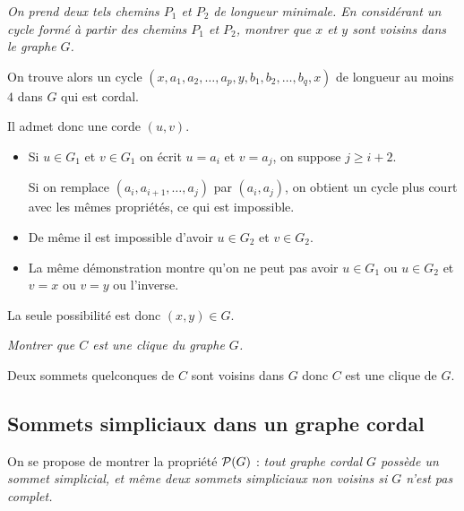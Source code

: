 \begin{Exercise}\it
On prend deux tels chemins $P_1$ et $P_2$ de longueur minimale. En considérant un cycle formé à partir des chemins $P_1$ et $P_2$, montrer que $x$ et $y$ sont voisins dans le graphe $G$.
\end{Exercise}  
\begin{Answer}
On trouve alors un cycle $(x, a_1,a_2, \ldots,a_p,y, b_1,b_2, \ldots,b_q,x)$ de longueur au moins $4$ dans $G$ qui est cordal.

Il admet donc une corde $(u,v)$. 
\begin{itemize}
\item Si $u\in G_1$ et $v\in G_1$ on écrit $u=a_i$ et $v=a_j$, on suppose $j\ge i+2$.

Si on remplace $(a_i,a_{i+1}, \ldots, a_j)$ par $(a_i,a_j)$, on obtient un cycle plus court avec les mêmes propriétés, ce qui est impossible.
\item De même il est impossible d'avoir $u\in G_2$ et $v\in G_2$.
\item La même démonstration montre qu'on ne peut pas avoir $u\in G_1$ ou $u\in G_2$ et $v=x$ ou $v=y$ ou l'inverse.
\end{itemize}
La seule possibilité est donc $(x,y) \in G$.
\end{Answer}
\begin{Exercise}\it
Montrer que $C$ est une clique du graphe $G$.
\end{Exercise}  
\begin{Answer}
Deux sommets quelconques de $C$ sont voisins dans $G$ donc $C$ est une clique de $G$.
\end{Answer}
\subsection{Sommets simpliciaux dans un graphe cordal}
On se propose de montrer la propriété ${\cal P}(G)$ : {\it tout graphe cordal $G$ possède un sommet simplicial, et même deux sommets  simpliciaux non voisins si $G$ n'est pas complet.} 

